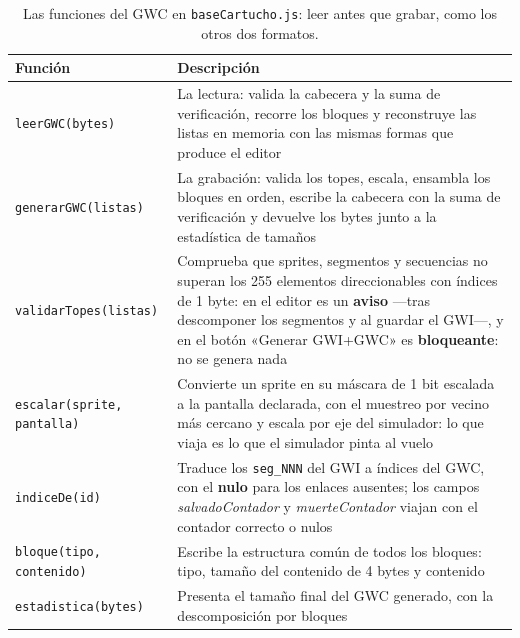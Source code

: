 \begin{table}[H]
	\centering
	\begin{tabularx}{\textwidth}{@{}l X@{}}
		\toprule
		\textbf{Función} & \textbf{Descripción} \\
		\midrule
		
		\texttt{leerGWC(bytes)} & La lectura: valida la
		cabecera y la suma de verificación, recorre los bloques y
		reconstruye las listas en memoria con las mismas formas que
		produce el editor \\
		
		\texttt{generarGWC(listas)} & La grabación: valida los
		topes, escala, ensambla los bloques en orden, escribe la
		cabecera con la suma de verificación y devuelve los bytes
		junto a la estadística de tamaños \\
		
		\texttt{validarTopes(listas)} & Comprueba que sprites,
		segmentos y secuencias no superan los 255 elementos
		direccionables con índices de 1 byte: en el editor es un
		\textbf{aviso} —tras descomponer los segmentos y al guardar
		el GWI—, y en el botón «Generar GWI+GWC» es
		\textbf{bloqueante}: no se genera nada \\
		
		\texttt{escalar(sprite, pantalla)} & Convierte un sprite en
		su máscara de 1 bit escalada a la pantalla declarada, con el
		muestreo por vecino más cercano y escala por eje del
		simulador: lo que viaja es lo que el simulador pinta al vuelo \\
		
		\texttt{indiceDe(id)} & Traduce los \texttt{seg\_NNN} del
		GWI a índices del GWC, con el \textbf{nulo} para los enlaces
		ausentes; los campos \emph{salvadoContador} y
		\emph{muerteContador} viajan con el contador correcto o
		nulos \\
		
		\texttt{bloque(tipo, contenido)} & Escribe la estructura
		común de todos los bloques: tipo, tamaño del contenido de 4
		bytes y contenido \\
		
		\texttt{estadistica(bytes)} & Presenta el tamaño final del
		GWC generado, con la descomposición por bloques \\
		\bottomrule
	\end{tabularx}
	\caption{Las funciones del GWC en \texttt{baseCartucho.js}: leer antes que grabar, como los otros dos formatos.}
	\label{tab:funcionesGWC}
\end{table}

